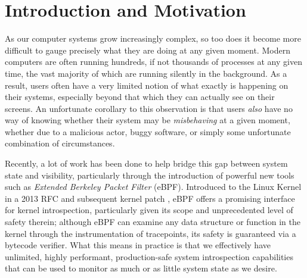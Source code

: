 \documentclass[
  12pt]{findlay}
\begin{document}
\singlespacing

\newpage
\begingroup
\hypersetup{linkcolor=black}
\tableofcontents

\newpage
\listoffigures
\newpage
\listoftables
\newpage
\lstlistoflistings
\endgroup

\onehalfspacing

\newpage
{}
\setcounter{page}{1}

\hypertarget{introduction-and-motivation}{%
\section{Introduction and
Motivation}\label{introduction-and-motivation}}

As our computer systems grow increasingly complex, so too does it become
more difficult to gauge precisely what they are doing at any given
moment. Modern computers are often running hundreds, if not thousands of
processes at any given time, the vast majority of which are running
silently in the background. As a result, users often have a very limited
notion of what exactly is happening on their systems, especially beyond
that which they can actually see on their screens. An unfortunate
corollary to this observation is that users \emph{also} have no way of
knowing whether their system may be \emph{misbehaving} at a given
moment, whether due to a malicious actor, buggy software, or simply some
unfortunate combination of circumstances.

Recently, a lot of work has been done to help bridge this gap between
system state and visibility, particularly through the introduction of
powerful new tools such as \emph{Extended Berkeley Packet Filter}
(eBPF). Introduced to the Linux Kernel in a 2013 RFC and subsequent
kernel patch \autocite{starovoitov13,starovoitov14}, eBPF offers a
promising interface for kernel introspection, particularly given its
scope and unprecedented level of safety therein; although eBPF can
examine any data structure or function in the kernel through the
instrumentation of tracepoints, its safety is guaranteed via a bytecode
verifier. What this means in practice is that we effectively have
unlimited, highly performant, production-safe system introspection
capabilities that can be used to monitor as much or as little system
state as we desire.
\end{document}
